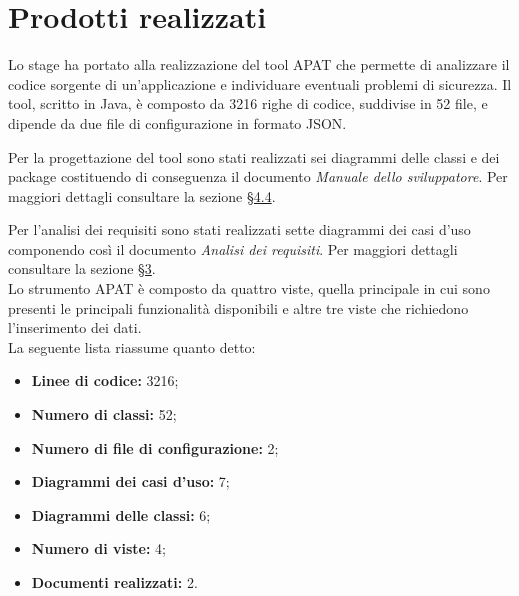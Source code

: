 
\section{Prodotti realizzati}\label{sec:prodotti-ottenuti}
Lo stage ha portato alla realizzazione del tool APAT che permette di analizzare il codice sorgente di un'applicazione e individuare eventuali problemi di sicurezza.
Il tool, scritto in Java, è composto da 3216 righe di codice, suddivise in 52 file, e dipende da due file di configurazione in formato JSON.

Per la progettazione del tool sono stati realizzati sei diagrammi delle classi e dei package costituendo di conseguenza il documento \textit{Manuale dello sviluppatore}.
Per maggiori dettagli consultare la sezione \hyperref[sec:progettazione]{\S4.4}.

Per l'analisi dei requisiti sono stati realizzati sette diagrammi dei casi d'uso componendo così il documento \textit{Analisi dei requisiti}.
Per maggiori dettagli consultare la sezione \hyperref[ch:analisi-requisiti]{\S3}.\\
Lo strumento APAT è composto da quattro viste, quella principale in cui sono presenti le principali funzionalità disponibili e altre tre viste che richiedono l'inserimento dei dati.\\
La seguente lista riassume quanto detto:

\begin{itemize}
    \item \textbf{Linee di codice:} 3216;
    \item \textbf{Numero di classi:} 52;
    \item \textbf{Numero di file di configurazione:} 2;
    \item \textbf{Diagrammi dei casi d'uso:} 7;
    \item \textbf{Diagrammi delle classi:} 6;
    \item \textbf{Numero di viste:} 4;
    \item \textbf{Documenti realizzati:} 2.
\end{itemize}